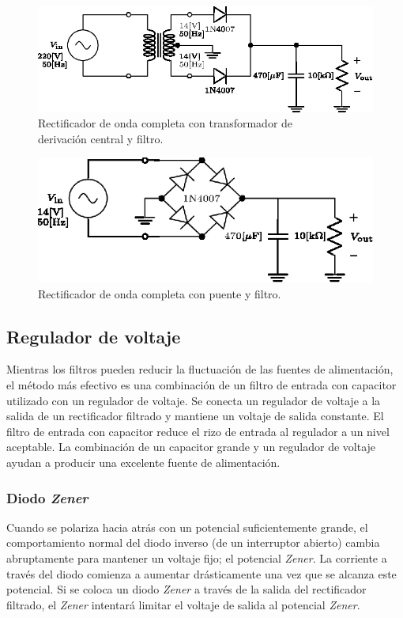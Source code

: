 \documentclass[letter,twoside,11pt]{article}
\begin{document}
\begin{figure}[!h]
\centering
\includegraphics[scale=1.25]{06.derivacion_central2.eps}
\caption{Rectificador de onda completa con transformador de\\
derivación central y filtro.}
\label{circuito6}
\end{figure}

\begin{figure}[!h]
\centering
\includegraphics[scale=1.25]{07.onda_completa2.eps}
\caption{Rectificador de onda completa con puente y filtro.}
\label{circuito7}
\end{figure}

\subsection{Regulador de voltaje}
Mientras los filtros pueden reducir la fluctuación de las fuentes de
alimentación, el método más efectivo es una combinación de un filtro de entrada
con capacitor utilizado con un regulador de voltaje. Se conecta un regulador de
voltaje a la salida de un rectificador filtrado y mantiene un voltaje de salida
constante. El filtro de entrada con capacitor reduce el rizo de entrada al
regulador a un nivel aceptable. La combinación de un capacitor grande y un
regulador de voltaje ayudan a producir una excelente fuente de alimentación.

\subsubsection{Diodo \emph{Zener}}
Cuando se polariza hacia atrás con un potencial suficientemente grande, el
comportamiento normal del diodo inverso (de un interruptor abierto) cambia
abruptamente para mantener un voltaje fijo; el potencial \emph{Zener}. La
corriente a través del diodo comienza a aumentar drásticamente una vez que se
alcanza este potencial. Si se coloca un diodo \emph{Zener} a través de la salida
del rectificador filtrado, el \emph{Zener} intentará limitar el voltaje
de salida al potencial \emph{Zener}.
\end{document}
